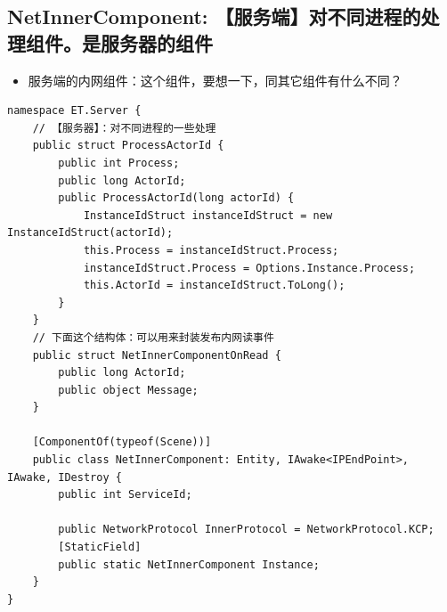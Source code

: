 \documentclass[9pt, b5paper]{article}
\begin{document}
\subsection{NetInnerComponent: 【服务端】对不同进程的处理组件。是服务器的组件}
\label{sec-3-10}
\begin{itemize}
\item 服务端的内网组件：这个组件，要想一下，同其它组件有什么不同？
\end{itemize}
\begin{verbatim}
namespace ET.Server {
    // 【服务器】：对不同进程的一些处理
    public struct ProcessActorId {
        public int Process;
        public long ActorId;
        public ProcessActorId(long actorId) {
            InstanceIdStruct instanceIdStruct = new InstanceIdStruct(actorId);
            this.Process = instanceIdStruct.Process;
            instanceIdStruct.Process = Options.Instance.Process;
            this.ActorId = instanceIdStruct.ToLong();
        }
    }
    // 下面这个结构体：可以用来封装发布内网读事件
    public struct NetInnerComponentOnRead {
        public long ActorId;
        public object Message;
    }
    
    [ComponentOf(typeof(Scene))]
    public class NetInnerComponent: Entity, IAwake<IPEndPoint>, IAwake, IDestroy {
        public int ServiceId;
        
        public NetworkProtocol InnerProtocol = NetworkProtocol.KCP;
        [StaticField]
        public static NetInnerComponent Instance;
    }
}
\end{verbatim}
\end{document}
